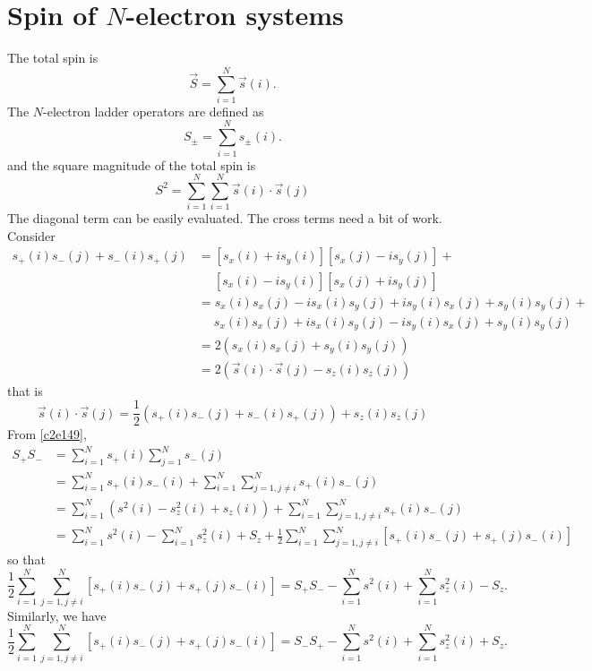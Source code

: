 \section{Spin of $N$-electron systems}
The total spin is
\begin{equation}\label{c2e148}
\vec{S} = \sum_{i=1}^N\vec{s}(i).
\end{equation}
The $N$-electron ladder operators are defined as 
\begin{equation}\label{c2e149}
S_\pm = \sum_{i=1}^Ns_\pm(i).
\end{equation}
and the square magnitude of the total spin is
\begin{equation}\label{c2e150}
S^2 = \sum_{i=1}^N \sum_{i=1}^N \vec{s}(i)\cdot \vec{s}(j)
\end{equation}
The diagonal term can be easily evaluated. The cross terms need a bit of work.
Consider
\[
\begin{aligned}
s_+(i)s_-(j) + s_-(i)s_+(j) &= [s_x(i) + is_y(i)][s_x(j) - is_y(j)] + \\
 &\quad\;  [s_x(i) - is_y(i)][s_x(j) + is_y(j)] \\
 &= s_x(i)s_x(j) - is_x(i)s_y(j) + is_y(i)s_x(j) + s_y(i)s_y(j) + \\
 &\quad\; s_x(i)s_x(j) + is_x(i)s_y(j) - is_y(i)s_x(j) + s_y(i)s_y(j) \\ 
 &= 2(s_x(i)s_x(j) + s_y(i)s_y(j)) \\
 &= 2(\vec{s}(i)\cdot\vec{s}(j) - s_z(i)s_z(j))
\end{aligned}
\]
that is
\begin{equation}\label{c2e151}
\vec{s}(i)\cdot\vec{s}(j) = 
\frac{1}{2}(s_+(i)s_-(j) + s_-(i)s_+(j)) + s_z(i)s_z(j)
\end{equation}
From \eqref{c2e149},
\[
\begin{aligned}
S_+S_- &= \sum_{i=1}^Ns_+(i)\sum_{j=1}^Ns_-(j) \\
 &= \sum_{i=1}^N s_+(i)s_-(i) + \sum_{i=1}^N\sum_{j=1,j\ne i}^N s_+(i)s_-(j) \\
 &= \sum_{i=1}^N(s^2(i) - s_z^2(i) + s_z(i)) + 
    \sum_{i=1}^N\sum_{j=1,j\ne i}^N s_+(i)s_-(j) \\
 &= \sum_{i=1}^Ns^2(i) - \sum_{i=1}^N s_z^2(i) + S_z + 
    \frac{1}{2}\sum_{i=1}^N\sum_{j=1,j\ne i}^N[s_+(i)s_-(j) + s_+(j)s_-(i)]
\end{aligned}
\]
so that
\begin{equation}\label{c2e152}
\frac{1}{2}\sum_{i=1}^N\sum_{j=1,j\ne i}^N[s_+(i)s_-(j) + s_+(j)s_-(i)] = 
S_+S_- - \sum_{i=1}^Ns^2(i) + \sum_{i=1}^N s_z^2(i) - S_z.
\end{equation}
Similarly, we have
\begin{equation}\label{c2e153}
\frac{1}{2}\sum_{i=1}^N\sum_{j=1,j\ne i}^N[s_+(i)s_-(j) + s_+(j)s_-(i)] = 
S_-S_+ - \sum_{i=1}^Ns^2(i) + \sum_{i=1}^N s_z^2(i) + S_z.
\end{equation}

